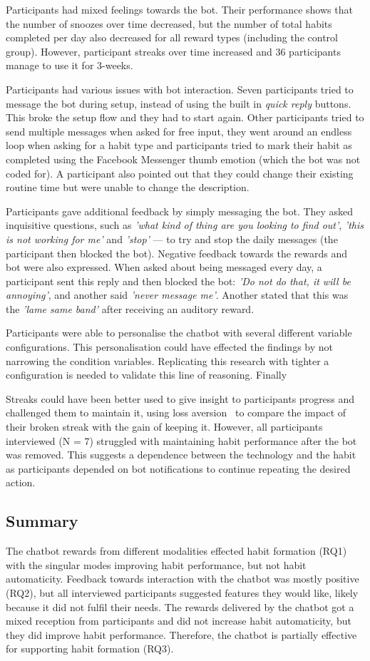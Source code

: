 Participants had mixed feelings towards the bot. Their performance shows that the number of snoozes over time decreased, but the number of total habits completed per day also decreased for all reward types (including the control group). However, participant streaks over time increased and 36 participants manage to use it for 3-weeks.

Participants had various issues with bot interaction. Seven participants tried to message the bot during setup, instead of using the built in \textit{quick reply} buttons. This broke the setup flow and they had to start again. Other participants tried to send multiple messages when asked for free input, they went around an endless loop when asking for a habit type and participants tried to mark their habit as completed using the Facebook Messenger thumb emotion (which the bot was not coded for). A participant also pointed out that they could change their existing routine time but were unable to change the description.

Participants gave additional feedback by simply messaging the bot. They asked inquisitive questions, such as \textit{'what kind of thing are you looking to find out'}, \textit{'this is not working for me'} and \textit{'stop'} --- to try and stop the daily messages (the participant then blocked the bot). Negative feedback towards the rewards and bot were also expressed. When asked about being messaged every day, a participant sent this reply and then blocked the bot: \textit{'Do not do that, it will be annoying'}, and another said \textit{'never message me'}. Another stated that this was the \textit{'lame same band'} after receiving an auditory reward.

Participants were able to personalise the chatbot with several different variable configurations. This personalisation could have effected the findings by not narrowing the condition variables. Replicating this research with tighter a configuration is needed to validate this line of reasoning. Finally

Streaks could have been better used to give insight to participants progress and challenged them to maintain it, using loss aversion~\cite{loss_aversion} to compare the impact of their broken streak with the gain of keeping it. However, all participants interviewed (N = 7) struggled with maintaining habit performance after the bot was removed. This suggests a dependence between the technology and the habit as participants depended on bot notifications to continue repeating the desired action.


\subsection*{Summary}
The chatbot rewards from different modalities effected habit formation (RQ1) with the singular modes improving habit performance, but not habit automaticity. Feedback towards interaction with the chatbot was mostly positive (RQ2), but all interviewed participants suggested features they would like, likely because it did not fulfil their needs. The rewards delivered by the chatbot got a mixed reception from participants and did not increase habit automaticity, but they did improve habit performance. Therefore, the chatbot is partially effective for supporting habit formation (RQ3).
